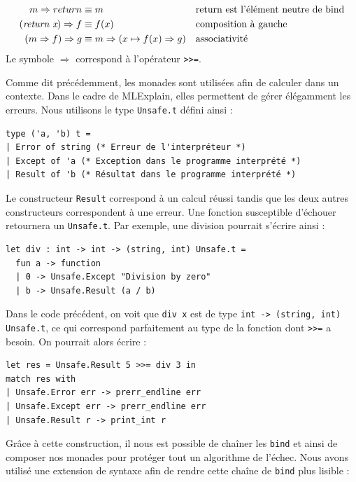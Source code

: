 \documentclass{easychair}
\begin{document}
\begin{align*}
m \Rightarrow return &\equiv m && \text{return est l'élément neutre de bind} \\
(\textit{\mbox{return x}}) \Rightarrow f &\equiv f(x) && \text{composition à 
gauche} \\
(m \Rightarrow f) \Rightarrow g &\equiv m \Rightarrow (x \mapsto f(x) 
\Rightarrow g) && \text{associativité}
\end{align*}
Le symbole $\Rightarrow$ correspond à l'opérateur \verb|>>=|.

Comme dit précédemment, les monades sont utilisées afin de calculer dans un 
contexte. Dans le cadre de MLExplain, elles permettent de gérer élégamment les 
erreurs. Nous utilisons le type \verb|Unsafe.t| défini ainsi :

\begin{verbatim}
type ('a, 'b) t =
| Error of string (* Erreur de l'interpréteur *)
| Except of 'a (* Exception dans le programme interprété *)
| Result of 'b (* Résultat dans le programme interprété *)
\end{verbatim}

Le constructeur \verb|Result| correspond à un calcul réussi tandis que les deux 
autres constructeurs correspondent à une erreur. Une fonction susceptible 
d'échouer retournera un \verb|Unsafe.t|. Par exemple, une division pourrait 
s'écrire ainsi :

\begin{verbatim}
let div : int -> int -> (string, int) Unsafe.t =
  fun a -> function
  | 0 -> Unsafe.Except "Division by zero"
  | b -> Unsafe.Result (a / b)
\end{verbatim}

Dans le code précédent, on voit que \verb|div x| est de type \verb|int -> (string, int) Unsafe.t|,
ce qui correspond parfaitement au type de la fonction dont \verb|>>=| a besoin. On pourrait alors écrire :

\begin{verbatim}
let res = Unsafe.Result 5 >>= div 3 in
match res with
| Unsafe.Error err -> prerr_endline err
| Unsafe.Except err -> prerr_endline err
| Unsafe.Result r -> print_int r
\end{verbatim}

Grâce à cette construction, il nous est possible de chaîner les \verb|bind| et 
ainsi de composer nos monades pour protéger tout un algorithme de l'échec. Nous 
avons utilisé une extension de syntaxe afin de rendre cette chaîne de 
\verb|bind| plus lisible :
\end{document}
